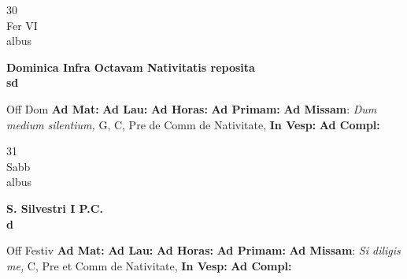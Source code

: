 \documentclass[10pt, openany]{book}
\begin{document}
    \begin{center}
        \begin{minipage}{3.5in}
            \vspace{2em}
            \begin{minipage}{0.5in}
                {\Huge 30} \\
                {\normalsize Fer VI} \\
                {\normalsize albus}
            \end{minipage}
            \begin{minipage}{3.0in}
                \textbf{ \large Dominica Infra Octavam Nativitatis reposita \\
                \textnormal{\normalsize sd}} \\ 
            \end{minipage}
            \begin{justify}Off Dom
                \textbf{Ad Mat: }
                \textbf{Ad Lau: }
                \textbf{Ad Horas: }
                \textbf{Ad Primam: }\textbf{Ad Missam}: \textit{Dum medium silentium,} G, C, Pre de Comm de Nativitate,  
                \textbf{In Vesp: }
                \textbf{Ad Compl: }
            \end{justify}
        \end{minipage}
    \end{center}

    \begin{center}
        \begin{minipage}{3.5in}
            \vspace{2em}
            \begin{minipage}{0.5in}
                {\Huge 31} \\
                {\normalsize Sabb} \\
                {\normalsize albus}
            \end{minipage}
            \begin{minipage}{3.0in}
                \textbf{ \large S. Silvestri I P.C. \\
                \textnormal{\normalsize d}} \\ 
            \end{minipage}
            \begin{justify}Off Festiv
                \textbf{Ad Mat: }
                \textbf{Ad Lau: }
                \textbf{Ad Horas: }
                \textbf{Ad Primam: }\textbf{Ad Missam}: \textit{Si diligis me,} C, Pre et Comm de Nativitate,  
                \textbf{In Vesp: }
                \textbf{Ad Compl: }
            \end{justify}
        \end{minipage}
    \end{center}
\end{document}
